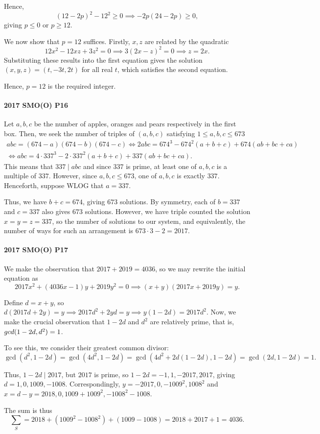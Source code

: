 \documentclass[../jarvis.tex]{subfiles}
\begin{document}
Hence, 
$$(12-2p)^2-12^2\geq 0 \implies -2p(24-2p)\geq 0,$$
giving $p\leq 0$ or $p\geq 12$.

We now show that $p=12$ suffices. Firstly, $x,z$ are related by the quadratic $$12x^2-12xz+3z^2=0 \implies 3(2x-z)^2=0 \implies z=2x.$$
Substituting these results into the first equation gives the solution $(x,y,z)=(t,-3t,2t)$ for all real $t$, which satisfies the second equation.

Hence, $p=\boxed{12}$ is the required integer.

\paragraph{2017 SMO(O) P16}Let $a,b,c$ be the number of apples, oranges and pears respectively in the first box. Then, we seek the number of triples of $(a,b,c)$ satisfying $1\leq a,b,c\leq 673$
\begin{align*}
    abc=(674-a)(674-b)(674-c) \iff 2abc=674^3-674^2(a+b+c)+674(ab+bc+ca) \\
    \iff abc=4\cdot 337^3-2\cdot 337^2(a+b+c)+337(ab+bc+ca).
\end{align*}
This means that $337\mid abc$ and since $337$ is prime, at least one of $a,b,c$ is a multiple of $337$. However, since $a,b,c\leq 673$, one of $a,b,c$ is exactly $337$. Henceforth, suppose WLOG that $a=337$.

Thus, we have $b+c=674$, giving $673$ solutions. By symmetry, each of $b=337$ and $c=337$ also gives $673$ solutions. However, we have triple counted the solution $x=y=z=337$, so the number of solutions to our system, and equivalently, the number of ways for such an arrangement is $673\cdot 3-2=\boxed{2017}.$

\paragraph{2017 SMO(O) P17}We make the observation that $2017+2019=4036$, so we may rewrite the initial equation as
$$2017x^2+(4036x-1)y+2019y^2=0 \implies (x+y)(2017x+2019y)=y.$$

Define $d=x+y$, so $d(2017d+2y)=y \implies 2017d^2+2yd=y \implies y(1-2d)=2017d^2$. Now, we make the crucial observation that $1-2d$ and $d^2$ are relatively prime, that is, $\\gcd(1-2d,d^2)=1$.

To see this, we consider their greatest common divisor: $$\gcd(d^2, 1-2d)=\gcd(4d^2, 1-2d)=\gcd(4d^2+2d(1-2d), 1-2d)=\gcd(2d,1-2d)=1.$$

Thus, $1-2d\mid 2017$, but $2017$ is prime, so $1-2d=-1,1,-2017,2017$, giving $d=1,0,1009,-1008$. Correspondingly, $y=-2017,0,-1009^2,1008^2$ and $x=d-y=2018,0,1009+1009^2,-1008^2-1008$.

The sum is thus 
$$\sum_{S}=2018+(1009^2-1008^2)+(1009-1008)=2018+2017+1=\boxed{4036}.$$
\end{document}
